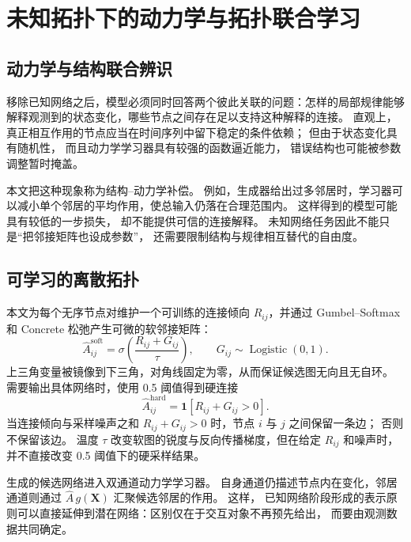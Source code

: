 \section{未知拓扑下的动力学与拓扑联合学习}

\subsection{动力学与结构联合辨识}

移除已知网络之后，模型必须同时回答两个彼此关联的问题：怎样的局部规律能够解释观测到的状态变化，哪些节点之间存在足以支持这种解释的连接。
直观上，
真正相互作用的节点应当在时间序列中留下稳定的条件依赖；
但由于状态变化具有随机性，
而且动力学学习器具有较强的函数逼近能力，
错误结构也可能被参数调整暂时掩盖。

本文把这种现象称为结构--动力学补偿。
例如，生成器给出过多邻居时，学习器可以减小单个邻居的平均作用，使总输入仍落在合理范围内。
这样得到的模型可能具有较低的一步损失，
却不能提供可信的连接解释。
未知网络任务因此不能只是“把邻接矩阵也设成参数”，
还需要限制结构与规律相互替代的自由度。

\subsection{可学习的离散拓扑}

本文为每个无序节点对维护一个可训练的连接倾向 $R_{ij}$，并通过 Gumbel--Softmax 和 Concrete 松弛产生可微的软邻接矩阵\cite{jang2017,maddison2017}：
\begin{equation}
\hat A_{ij}^{\mathrm{soft}}
=\sigma\!\left(\frac{R_{ij}+G_{ij}}{\tau}\right),
\qquad G_{ij}\sim\operatorname{Logistic}(0,1).
\label{eq:gumbel-soft}
\end{equation}
上三角变量被镜像到下三角，对角线固定为零，从而保证候选图无向且无自环。
需要输出具体网络时，使用 0.5 阈值得到硬连接
\begin{equation}
\hat A_{ij}^{\mathrm{hard}}=\mathbf{1}[R_{ij}+G_{ij}>0].
\label{eq:hard-sample}
\end{equation}
当连接倾向与采样噪声之和 $R_{ij}+G_{ij}>0$ 时，节点 $i$ 与 $j$ 之间保留一条边；
否则不保留该边。
温度 $\tau$ 改变软图的锐度与反向传播梯度，但在给定 $R_{ij}$ 和噪声时，并不直接改变 0.5 阈值下的硬采样结果。

生成的候选网络进入双通道动力学学习器。
自身通道仍描述节点内在变化，邻居通道则通过 $\hat A\,g(\mathbf X)$ 汇聚候选邻居的作用。
这样，
已知网络阶段形成的表示原则可以直接延伸到潜在网络：区别仅在于交互对象不再预先给出，
而要由观测数据共同确定。

